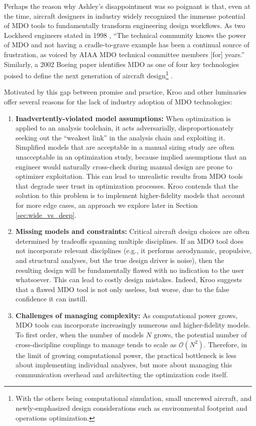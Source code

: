 \documentclass[12pt,vi,oneside]{report}
\begin{document}
    Perhaps the reason why Ashley's disappointment was so poignant is that, even at the time, aircraft designers in industry widely recognized the immense potential of MDO tools to fundamentally transform engineering design workflows. As two Lockheed engineers stated in 1998 \cite{radovcich_f22_1998}, ``The technical community knows the power of MDO and not having a cradle-to-grave example has been a continual source of frustration, as voiced by AIAA MDO technical committee members [for] years.'' Similarly, a 2002 Boeing paper identifies MDO as one of four key technologies poised to define the next generation of aircraft design\footnote{With the others being computational simulation, small uncrewed aircraft, and newly-emphasized design considerations such as environmental footprint and operations optimization.} \cite{mcmasters_airplane_2002}.

    Motivated by this gap between promise and practice, Kroo and other luminaries offer several reasons for the lack of industry adoption of MDO technologies:

    \begin{enumerate}
        \item \textbf{Inadvertently-violated model assumptions:} When optimization is applied to an analysis toolchain, it acts adversarially, disproportionately seeking out the ``weakest link'' in the analysis chain and exploiting it. Simplified models that are acceptable in a manual sizing study are often unacceptable in an optimization study, because implied assumptions that an engineer would naturally cross-check during manual design are prone to optimizer exploitation. This can lead to unrealistic results from MDO tools that degrade user trust in optimization processes. Kroo contends that the solution to this problem is to implement higher-fidelity models that account for more edge cases, an approach we explore later in Section \ref{sec:wide_vs_deep}.
        \item \textbf{Missing models and constraints:} Critical aircraft design choices are often determined by tradeoffs spanning multiple disciplines. If an MDO tool does not incorporate relevant disciplines (e.g., it performs aerodynamic, propulsive, and structural analyses, but the true design driver is noise), then the resulting design will be fundamentally flawed with no indication to the user whatsoever. This can lead to costly design mistakes. Indeed, Kroo suggests that a flawed MDO tool is not only useless, but worse, due to the false confidence it can instill.
        \item \textbf{Challenges of managing complexity:} As computational power grows, MDO tools can incorporate increasingly numerous and higher-fidelity models. To first order, when the number of models $N$ grows, the potential number of cross-discipline couplings to manage tends to scale as $\mathcal{O}(N^2)$. Therefore, in the limit of growing computational power, the practical bottleneck is less about implementing individual analyses, but more about managing this communication overhead and architecting the optimization code itself.
    \end{enumerate}
\end{document}
